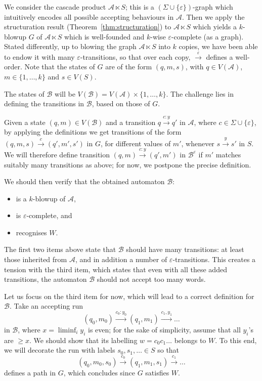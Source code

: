 \documentclass[a4paper,UKenglish,cleveref, thm-restate]{lipics-v2021}
\newcommand{\re}[1]{\xrightarrow{#1}}
\newcommand{\eps}{\varepsilon}
\newcommand{\A}{\mathcal{A}}
\newcommand{\casc}{\ltimes}
\newcommand{\B}{\mathcal B}
\begin{document}
We consider the cascade product $\A \casc S$; this is a $(\Sigma \cup \{\eps\})$-graph which intuitively encodes all possible accepting behaviours in $\A$.
Then we apply the structuration result (Theorem~\ref{thm:structuration}) to $\A \casc S$ which yields a $k$-blowup $G$ of $\A \casc S$ which is well-founded and $k$-wise $\eps$-complete (as a graph).
Stated differently, up to blowing the graph $\A \casc S$ into $k$ copies, we have been able to endow it with many $\eps$-transitions, so that over each copy, $\re \eps$ defines a well-order.
Note that the states of $G$ are of the form $(q,m,s)$, with $q\in V(\A)$, $m\in\{1,\dots,k\}$ and $s\in V(S)$.

The states of $\B$ will be $V(\B)=V(\A) \times \{1,\dots,k\}$.
The challenge lies in defining the transitions in $\B$, based on those of $G$.


Given a state $(q,m)\in V(\B)$ and a transition $q \re {c:y} q'$ in $\A$, where $c \in \Sigma \cup \{\eps\}$, by applying the definitions we get transitions of the form $(q,m,s) \re c (q',m',s')$ in $G$, for different values of $m'$, whenever $s \re y s'$ in $S$.
We will therefore define transition $(q,m) \re{c:y} (q',m')$ in $\B^\eps$ if $m'$ matches suitably many transitions as above; for now, we postpone the precise definition.

We should then verify that the obtained automaton $\B$:
\begin{itemize}
    \item is a $k$-blowup of $\A$,
    \item is $\eps$-complete, and
    \item recognises $W$.
\end{itemize}
The first two items above state that $\B$ should have many transitions: at least those inherited from $\A$, and in addition a number of $\eps$-transitions.
This creates a tension with the third item, which states that even with all these added transitions, the automaton $\B$ should not accept too many words.

Let us focus on the third item for now, which will lead to a correct definition for $\B$.
Take an accepting run
\[
    (q_0,m_0) \re{c_0:y_0} (q_1,m_1) \re{c_1,y_1} \dots
\]
in $\B$, where $x = \liminf_i y_i$ is even; for the sake of simplicity, assume that all $y_i$'s are $\geq x$.
We should show that its labelling $w=c_0c_1\dots$ belongs to $W$.
To this end, we will decorate the run with labels $s_0,s_1,\dots \in S$ so that
\[
    (q_0,m_0,s_0) \re{c_0} (q_1,m_1,s_1) \re{c_1} \dots
\]
defines a path in $G$, which concludes since $G$ satisfies $W$.
\end{document}
